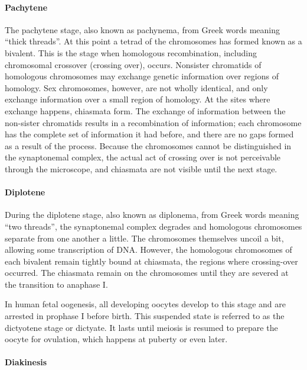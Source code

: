 \hypertarget{pachytene}{%
\paragraph{Pachytene}\label{pachytene}}

The pachytene stage, also known as pachynema, from Greek words meaning ``thick threads''. At this point a tetrad of the chromosomes has formed known as a bivalent. This is the stage when homologous recombination, including chromosomal crossover (crossing over), occurs. Nonsister chromatids of homologous chromosomes may exchange genetic information over regions of homology. Sex chromosomes, however, are not wholly identical, and only exchange information over a small region of homology. At the sites where exchange happens, chiasmata form. The exchange of information between the non-sister chromatids results in a recombination of information; each chromosome has the complete set of information it had before, and there are no gaps formed as a result of the process. Because the chromosomes cannot be distinguished in the synaptonemal complex, the actual act of crossing over is not perceivable through the microscope, and chiasmata are not visible until the next stage.

\hypertarget{diplotene}{%
\paragraph{Diplotene}\label{diplotene}}

During the diplotene stage, also known as diplonema, from Greek words meaning ``two threads'', the synaptonemal complex degrades and homologous chromosomes separate from one another a little. The chromosomes themselves uncoil a bit, allowing some transcription of DNA. However, the homologous chromosomes of each bivalent remain tightly bound at chiasmata, the regions where crossing-over occurred. The chiasmata remain on the chromosomes until they are severed at the transition to anaphase I.

In human fetal oogenesis, all developing oocytes develop to this stage and are arrested in prophase I before birth. This suspended state is referred to as the dictyotene stage or dictyate. It lasts until meiosis is resumed to prepare the oocyte for ovulation, which happens at puberty or even later.

\hypertarget{diakinesis}{%
\paragraph{Diakinesis}\label{diakinesis}}

